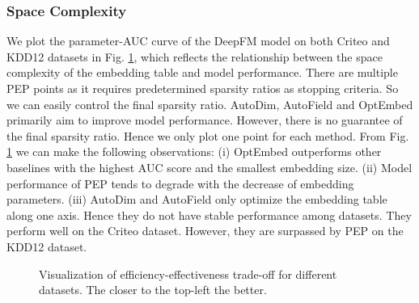 \documentclass[sigconf]{acmart}
\begin{document}
\subsubsection{Space Complexity}
We plot the parameter-AUC curve of the DeepFM model on both Criteo and KDD12 datasets in Fig. \ref{fig:Param-AUC}, which reflects the relationship between the space complexity of the embedding table and model performance. There are multiple PEP points as it requires predetermined sparsity ratios as stopping criteria. So we can easily control the final sparsity ratio. AutoDim, AutoField and OptEmbed primarily aim to improve model performance. However, there is no guarantee of the final sparsity ratio. Hence we only plot one point for each method.
From Fig. \ref{fig:Param-AUC} we can make the following observations: (i) OptEmbed outperforms other baselines with the highest AUC score and the smallest embedding size. (ii) Model performance of PEP tends to degrade with the decrease of embedding parameters. (iii) AutoDim and AutoField only optimize the embedding table along one axis. Hence they do not have stable performance among datasets. They perform well on the Criteo dataset. However, they are surpassed by PEP on the KDD12 dataset.
\begin{figure}[!htbp]
    \centering
    \vspace{-10pt}
    \caption{Visualization of efficiency-effectiveness trade-off for different datasets. The closer to the top-left the better.}
    \label{fig:Param-AUC}
    \vspace{-5pt}
\end{figure}
\end{document}
